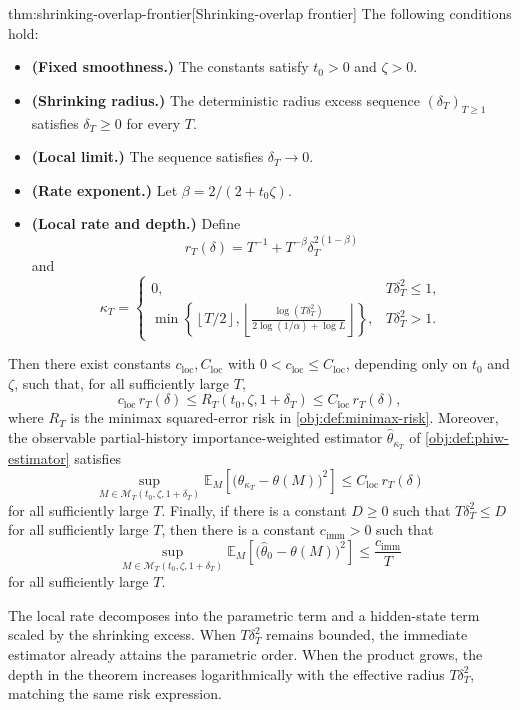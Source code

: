 \begin{theoremv}{thm:shrinking-overlap-frontier}[Shrinking-overlap frontier]
The following conditions hold:
\begin{itemize}
\item \textbf{(Fixed smoothness.)} The constants satisfy \(t_0>0\) and \(\zeta>0\).
\item \textbf{(Shrinking radius.)} The deterministic radius excess sequence \((\delta_T)_{T\ge1}\) satisfies \(\delta_T\ge0\) for every \(T\).
\item \textbf{(Local limit.)} The sequence satisfies \(\delta_T\to0\).
\item \textbf{(Rate exponent.)} Let \(\beta=2/(2+t_0\zeta)\).
\item \textbf{(Local rate and depth.)} Define
\[
r_T(\delta)
=
T^{-1}+T^{-\beta}\delta_T^{2(1-\beta)}
\]
and
\[
\kappa_T
=
\begin{cases}
0, & T\delta_T^2\le 1,\\[3pt]
\displaystyle
\min\left\{\left\lfloor T/2\right\rfloor,
\left\lfloor
\frac{\log(T\delta_T^2)}
{2\log(1/\alpha)+\log L}
\right\rfloor\right\}, & T\delta_T^2>1.
\end{cases}
\]
\end{itemize}
Then there exist constants \(c_{\mathrm{loc}},C_{\mathrm{loc}}\) with
\(0<c_{\mathrm{loc}}\le C_{\mathrm{loc}}\), depending only on \(t_0\) and
\(\zeta\), such that, for all sufficiently large \(T\),
\[
c_{\mathrm{loc}}\,r_T(\delta)
\le
R_T(t_0,\zeta,1+\delta_T)
\le
C_{\mathrm{loc}}\,r_T(\delta),
\]
where \(R_T\) is the minimax squared-error risk in
\cref{obj:def:minimax-risk}.  Moreover, the observable partial-history
importance-weighted estimator \(\widehat\theta_{\kappa_T}\) of
\cref{obj:def:phiw-estimator} satisfies
\[
\sup_{M\in\mathcal M_T(t_0,\zeta,1+\delta_T)}
\mathbb E_M\!\left[
\bigl(\widehat\theta_{\kappa_T}-\theta(M)\bigr)^2
\right]
\le
C_{\mathrm{loc}}\,r_T(\delta)
\]
for all sufficiently large \(T\).  Finally, if there is a constant \(D\ge0\)
such that \(T\delta_T^2\le D\) for all sufficiently large \(T\), then there is
a constant \(c_{\mathrm{imm}}>0\) such that
\[
\sup_{M\in\mathcal M_T(t_0,\zeta,1+\delta_T)}
\mathbb E_M\!\left[
\bigl(\widehat\theta_{0}-\theta(M)\bigr)^2
\right]
\le
\frac{c_{\mathrm{imm}}}{T}
\]
for all sufficiently large \(T\).
\end{theoremv}

The local rate decomposes into the parametric term and a hidden-state term scaled by the shrinking excess. When \(T\delta_T^2\) remains bounded, the immediate estimator already attains the parametric order. When the product grows, the depth in the theorem increases logarithmically with the effective radius \(T\delta_T^2\), matching the same risk expression.
